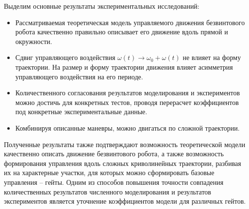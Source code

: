 Выделим основные результаты экспериментальных исследований:

\begin{itemize}
	\item Рассматриваемая теоретическая модель управляемого движения безвинтового робота качественно правильно  описывает его движение вдоль прямой и окружности. %
	
	\item Сдвиг управляющего воздействия $\omega(t) \rightarrow \omega_0 + \omega(t)$ не влияет на форму траектории. На размер и форму траектории движения влияет асимметрия управляющего воздействия на его периоде.
	
	\item Количественного согласования результатов моделирования и экспериментов можно достичь для конкретных тестов, проводя перерасчет коэффициентов под конкретные экспериментальные данные.
	
	\item Комбинируя описанные маневры, можно двигаться по сложной траектории.
	
	
\end{itemize}



Полученные результаты также подтверждают возможность теоретической модели качественно описать движение безвинтового робота, а также возможность формирования управления вдоль сложных криволинейных траектории, разбивая их на характерные участки, для которых можно сформировать базовые управления -- гейты. Одним из способов повышения точности совпадения количественных результатов численного моделирования и результатов экспериментов является уточнение коэффициентов модели для различных гейтов.

